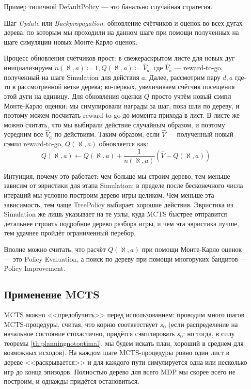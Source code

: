 \begin{example}
Пример типичной DefaultPolicy --- это банально случайная стратегия. 
\end{example}

\begin{definition}
    Шаг \emph{Update} или \emph{Backpropagation}: обновление счётчиков и оценок во всех дугах дерева, по которым мы проходили на данном шаге при помощи полученных на шаге симуляции новых Монте-Карло оценок.
\end{definition}

\begin{example}
Процесс обновления счётчиков прост: в свежераскрытом листе для новых дуг инициализируем $n(\aleph, a) \coloneqq 1, Q(\aleph, a) \coloneqq \hat{V}_a$, где $\hat{V}_a$ --- reward-to-go, полученный на шаге Simulation для действия $a$. Далее, рассмотрим пару $d, a$ где-то в рассмотренной ветке дерева; во-первых, увеличиваем счётчик посещения этой дуги на единицу. Для обновления оценки $Q$ просто учтём новый сэмпл Монте-Карло оценки: мы симулировали награды за шаг, пока шли по дереву, и поэтому можем посчитать reward-to-go до момента прихода в лист. В листе же можно считать, что мы выбирали действие случайным образом, и поэтому усредним все $\hat{V}_a$ по действиям. Таким образом, если $\hat{V}$ --- полученный новый сэмпл reward-to-go, $Q(\aleph, a)$ обновляется как:
$$Q(\aleph, a) \leftarrow Q(\aleph, a) + \frac{1}{n(\aleph, a)}(\hat{V} - Q(\aleph, a))$$
\end{example}

Интуиция, почему это работает: чем больше мы строим дерево, тем меньше зависим от эвристики для этапа Simulation; в пределе после бесконечного числа итераций мы условно построим дерево игры целиком. Чем меньше эта зависимость, тем чаще TreePolicy выбирает хорошие действия. Эвристика из Simulation же лишь указывает на те узлы, куда MCTS быстрее отправится детальнее строить подробное дерево разбора игры, и чем эта эвристика лучше, тем удачнее пройдёт ограниченный перебор.

Вполне можно считать, что расчёт $Q(\aleph, a)$ при помощи Монте-Карло оценок --- это Policy Evaluation, а поиск по дереву при помощи многоруких бандитов --- Policy Improvement.

\subsection{Применение MCTS}

MCTS можно <<предобучить>> перед использованием: проводим много шагов MCTS-процедуры, считая, что корню соответствует $s_0$ (если распределение на начальное состояние стохастично, придётся сэмплировать $s_0$: но тогда, в силу теоремы \ref{th:planningnotoptimal}, мы будем искать план, хороший в среднем для возможных исходов). На каждом шаге MCTS-процедуры ровно один лист в дереве <<раскрывается>> и для каждого пути симулируется одна или несколько игр до конца эпизодов. Полностью дерево для всего MDP мы скорее всего не построим, и однажды придётся остановиться.

